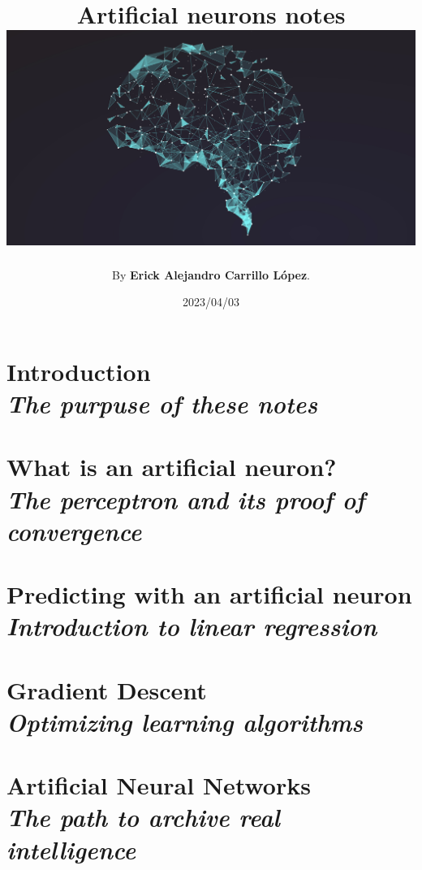 \documentclass[12pt]{book}
\title{\textbf{Artificial neurons notes}\\
  \vspace{1cm} %
  \includegraphics[scale = 0.7]{cover_page.jpg}
}
\author{By \textbf{Erick Alejandro Carrillo López}.}
\date{2023/04/03}
\newcommand\Chapter[2]{
  \chapter[#1: {\itshape#2}]{#1\\[2ex]\Large\itshape#2}
}
\begin{document}
\maketitle

\tableofcontents
{}

\Chapter{Introduction}{The purpuse of these notes}


\Chapter{What is an artificial neuron?}{The perceptron and its proof of convergence}


\Chapter{Predicting with an artificial neuron}{Introduction to linear regression}


\Chapter{Gradient Descent}{Optimizing learning algorithms}


\Chapter{Artificial Neural Networks}{The path to archive real intelligence}

\end{document}
